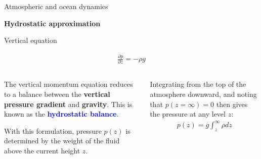 \documentclass[aspectratio=169,xcolor=dvipsnames]{beamer}
\newcommand\boldblue[1]{\textcolor{blue}{\textbf{#1}}}
\begin{document}
\begin{frame}[t]{Atmospheric and ocean dynamics}

\vspace{-1.0em}

\begin{center}
\textbf{{\large
Hydrostatic approximation
}}
\end{center}

\small 
\center 

\vspace{-0.5em}

Vertical equation

\vspace{-0.5em}

{\normalsize
\begin{align*}
    \frac{\partial p}{\partial z} = -\rho g
\end{align*}
}

\begin{columns}
    \begin{column}{0.4\textwidth}
        The vertical momentum equation reduces to a balance between the \textbf{vertical pressure gradient} and \textbf{gravity}. This is known as the \boldblue{hydrostatic balance}.

        \vspace{0.5em}
        
        With this formulation, pressure $p(z)$ is determined by the weight of the fluid above the current height $z$.
    \end{column}
    \begin{column}{0.4\textwidth}
        Integrating from the top of the atmosphere downward, and noting that $p(z=\infty)=0$ then gives the pressure at any level $z$:
        \begin{align*}
            p(z) = g \int_z^\infty \rho dz
        \end{align*}
    \end{column}
\end{columns}
        
\end{frame}
\end{document}
